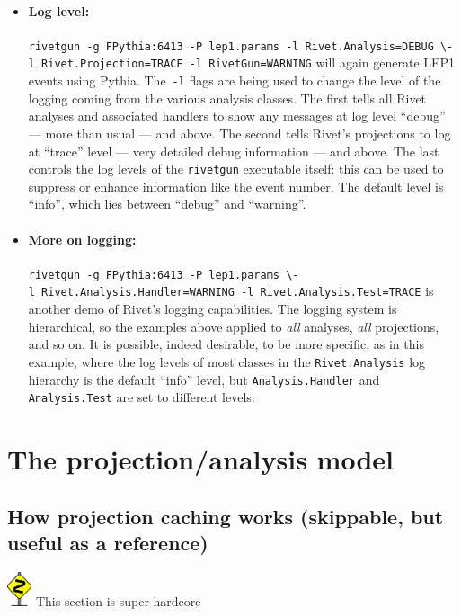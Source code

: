 \documentclass{JHEP3}
\newcommand{\kbd}[1]{\texttt{#1}\xspace}
\newcommand{\cmdbreak}{\textbackslash\newline}
\newcommand{\bendimg}{\includegraphics[height=1cm]{bend}}
\newenvironment{bend}{\bendimg}{\ignorespacesafterend}
\begin{document}
\begin{itemize}
\item \paragraph{Log level:}{\kbd{rivetgun -g~FPythia:6413 -P~lep1.params
      -l~Rivet.Analysis=DEBUG~\cmdbreak -l~Rivet.Projection=TRACE -l~RivetGun=WARNING}
    will again generate LEP1 events using Pythia. The~\kbd{-l} flags are being
    used to change the level of the logging coming from the various analysis
    classes. The first tells all Rivet analyses and associated handlers to show
    any messages at log level ``debug'' --- more than usual --- and above. The
    second tells Rivet's projections to log at ``trace'' level --- very detailed
    debug information --- and above. The last controls the log levels of the
    \kbd{rivetgun} executable itself: this can be used to suppress or enhance
    information like the event number. The default level is ``info'', which lies
    between ``debug'' and ``warning''.}

\item \paragraph{More on logging:}{\kbd{rivetgun -g~FPythia:6413 -P~lep1.params
      \cmdbreak -l~Rivet.Analysis.Handler=WARNING -l~Rivet.Analysis.Test=TRACE}
    is another demo of Rivet's logging capabilities. The logging system is
    hierarchical, so the examples above applied to \emph{all} analyses,
    \emph{all} projections, and so on. It is possible, indeed desirable, to be
    more specific, as in this example, where the log levels of most classes in
    the \kbd{Rivet.Analysis} log hierarchy is the default ``info'' level, but
    \kbd{Analysis.Handler} and \kbd{Analysis.Test} are set to different levels.}
\end{itemize}

\section{The projection/analysis model}

\subsection{How projection caching works (skippable, but useful as a reference)}
\begin{bend}
This section is super-hardcore
\end{bend}
\end{document}

